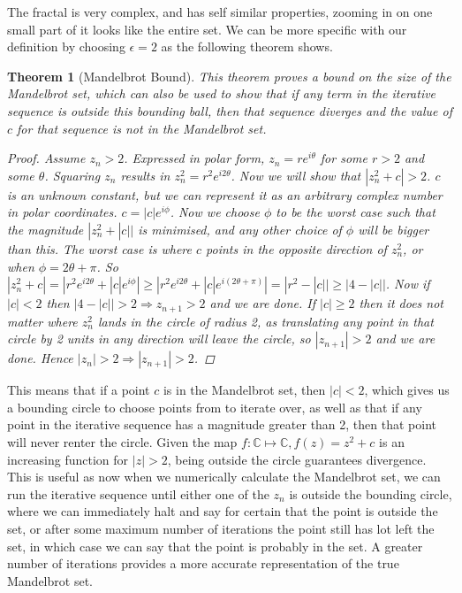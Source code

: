 \documentclass[a4paper,12pt]{article}
\newtheorem{theorem}{Theorem}[section]
\begin{document}
The fractal is very complex, and has self similar properties, zooming in on one small part of it looks like the entire set.
We can be more specific with our definition by choosing $\epsilon = 2$ as the following theorem shows.
\begin{theorem}[Mandelbrot Bound]
\label{bound}
This theorem proves a bound on the size of the Mandelbrot set, which can also be used to show that if any term in the iterative sequence is
outside this bounding ball, then that sequence diverges and the value of $c$ for that sequence is not in the Mandelbrot set. 
\begin{proof}
Assume $z_n > 2$. Expressed in polar form, $z_n = r e^{i \theta}$ for some $r>2$ and some $\theta$.
Squaring $z_n$ results in $z_n^2 = r^2 e^{i 2\theta}$. Now we will show that $|z_{n}^2 + c| > 2$. $c$ is an 
unknown constant, but we can represent it as an arbitrary complex number in polar coordinates. $c = |c| e^{i \phi}$. Now we choose $\phi$ 
to be the worst case such that the magnitude $|z_{n}^2 + |c||$ is minimised, and any other choice of $\phi$ will be bigger than this. The worst case is 
where $c$ points in the opposite direction of $z_n^2$, or when $\phi = 2 \theta + \pi$. 
So $|z_{n}^2 + c| = |r^2 e^{i 2\theta} + |c| e^{i \phi}| \geq |r^2 e^{i 2\theta} + |c| e^{i (2\theta + \pi)}|
= |r^2 - |c|| \geq |4 - |c||$. Now if $|c|<2$ then $|4 - |c|| > 2 \Rightarrow z_{n+1} > 2$ and we are done. If $|c| \geq 2$ then it does not matter where $z_n^2$ lands
in the circle of radius 2, as translating any point in that circle by 2 units in any direction will leave the circle, so $|z_{n+1}| > 2$ and we are done.
Hence $|z_n| > 2 \Rightarrow |z_{n+1}| > 2$.    
\end{proof}

\end{theorem}

This means that if a point $c$ is in the Mandelbrot set, then $|c| < 2$, which gives us a bounding circle to choose points from to iterate over, as well as that if
any point in the iterative sequence has a magnitude greater than 2, then that point will never renter the circle. Given the map $f : \mathbb{C} \mapsto \mathbb{C}, f(z) = z^2 + c$
is an increasing function for $|z| > 2$, being outside the circle guarantees divergence. 
This is useful as now when we numerically calculate the Mandelbrot set, we can run the iterative sequence until either one of the $z_n$ is outside the bounding circle, where we can immediately
halt and say for certain that the point is outside the set, or after some maximum number of iterations the point still has lot left the set, in which case we can say that the point is
probably in the set. A greater number of iterations provides a more accurate representation of the true Mandelbrot set.
\end{document}

